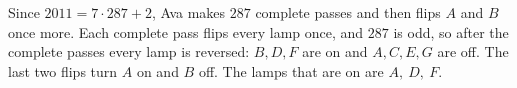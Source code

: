 Since $2011=7\cdot287+2$, Ava makes $287$ complete passes and then flips $A$ and $B$ once more. Each complete pass flips every lamp once, and $287$ is odd, so after the complete passes every lamp is reversed: $B,D,F$ are on and $A,C,E,G$ are off. The last two flips turn $A$ on and $B$ off. The lamps that are on are $\boxed{A,\ D,\ F}$.
